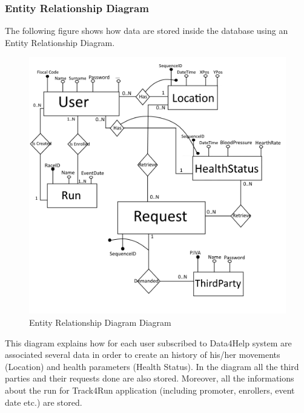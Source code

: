 \clearpage

\subsubsection{Entity Relationship Diagram}
The following figure shows how data are stored inside the database using an Entity Relationship Diagram.
\begin{figure}[H]
\centering
\includegraphics[scale=0.65]{Images/ERDiagram.png}
\caption{Entity Relationship Diagram Diagram}
\end{figure}
\noindent
This diagram explains how for each user subscribed to Data4Help system are associated several data in order to create an history of his/her movements (Location) and health parameters (Health Status). In the diagram all the third parties and their requests done are also stored. Moreover, all the informations about the run for Track4Run application (including promoter, enrollers, event date etc.) are stored.

\newpage
